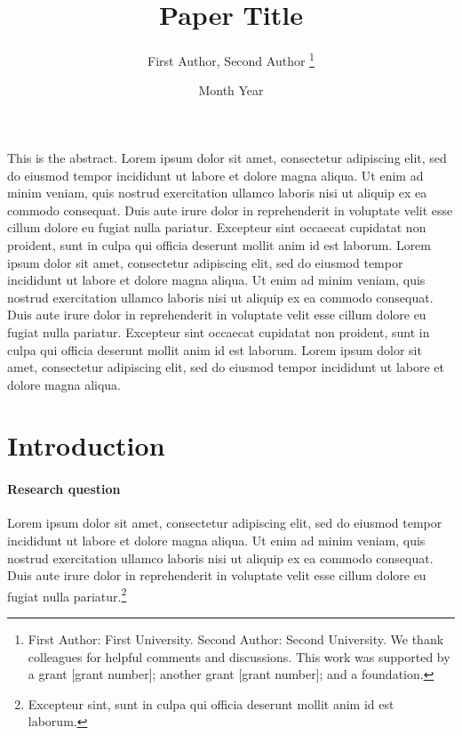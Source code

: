 \documentclass[letterpaper,11pt,leqno]{article}
\begin{document}
\title{Paper Title}

\author{First Author, Second Author
%
\thanks{First Author: First University. Second Author: Second University. We thank colleagues for helpful comments and discussions. This work was supported by a grant [grant number]; another grant [grant number]; and a foundation.}}

\date{Month Year}   


\begin{titlepage}
\maketitle

This is the abstract. Lorem ipsum dolor sit amet, consectetur adipiscing elit, sed do eiusmod tempor incididunt ut labore et dolore magna aliqua. Ut enim ad minim veniam, quis nostrud exercitation ullamco laboris nisi ut aliquip ex ea commodo consequat. Duis aute irure dolor in reprehenderit in voluptate velit esse cillum dolore eu fugiat nulla pariatur. Excepteur sint occaecat cupidatat non proident, sunt in culpa qui officia deserunt mollit anim id est laborum. Lorem ipsum dolor sit amet, consectetur adipiscing elit, sed do eiusmod tempor incididunt ut labore et dolore magna aliqua. Ut enim ad minim veniam, quis nostrud exercitation ullamco laboris nisi ut aliquip ex ea commodo consequat. Duis aute irure dolor in reprehenderit in voluptate velit esse cillum dolore eu fugiat nulla pariatur. Excepteur sint occaecat cupidatat non proident, sunt in culpa qui officia deserunt mollit anim id est laborum. Lorem ipsum dolor sit amet, consectetur adipiscing elit, sed do eiusmod tempor incididunt ut labore et dolore magna aliqua.

\end{titlepage}

\section{Introduction}\label{s:introduction}
 
\paragraph{Research question} Lorem ipsum dolor sit amet, consectetur adipiscing elit, sed do eiusmod tempor incididunt ut labore et dolore magna aliqua. Ut enim ad minim veniam, quis nostrud exercitation ullamco laboris nisi ut aliquip ex ea commodo consequat. Duis aute irure dolor in reprehenderit in voluptate velit esse cillum dolore eu fugiat nulla pariatur.\footnote{Excepteur sint, sunt in culpa qui officia deserunt mollit anim id est laborum.}
\end{document}
